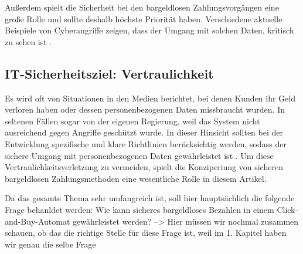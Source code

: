 Außerdem spielt die Sicherheit bei den bargeldlosen Zahlungsvorgängen eine große Rolle und sollte
deshalb höchste Priorität haben. Verschiedene aktuelle Beispiele von Cyberangriffe zeigen, dass der 
Umgang mit solchen Daten, kritisch zu sehen ist \cite{booklet:BKCB}. 

\subsection{IT-Sicherheitsziel: Vertraulichkeit}
Es wird oft von Situationen in den Medien berichtet, bei denen Kunden ihr Geld verloren haben oder dessen
personenbezogenen Daten missbraucht wurden. In seltenen Fällen sogar von der eigenen Regierung, weil das System 
nicht ausreichend gegen Angriffe geschützt wurde. In dieser Hinsicht sollten bei der Entwicklung spezifische 
und klare Richtlinien berücksichtig werden, sodass der sichere Umgang mit personenbezogenen Daten gewährleistet ist 
\cite{refart:TRVR}. Um diese Vertraulichkeitsverletzung zu vermeiden, spielt die Konziperiung von sicheren 
bargeldlosen Zahlungsmethoden eine wesentliche Rolle in diesem Artikel. 

Da das gesamte Thema sehr umfangreich ist, soll hier hauptsächlich die folgende Frage behanldet werden: 
Wie kann sicheres bargeldloses Bezahlen in einem Click-and-Buy-Automat gewährleistet werden?
--> Hier müssen wir nochmal zusammen schauen, ob das die richtige Stelle für diese Frage ist, weil im 1. Kapitel haben wir genau die selbe Frage 